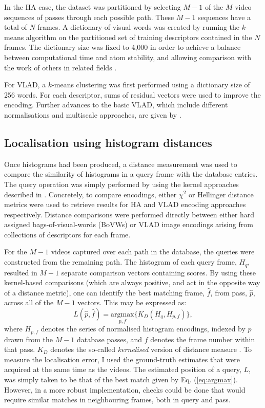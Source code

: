 In the HA case, the dataset was partitioned by selecting $M-1$ of the $M$ video sequences of passes through each possible path. These $M-1$ sequences have a total of $N$ frames. A dictionary of visual words was created by running the $k$-means algorithm on the partitioned set of training descriptors contained in the $N$ frames. The dictionary size was fixed to 4,000 in order to achieve a balance between computational time and atom stability, and allowing comparison with the work of others in related fields \cite{Chatfield2011}.

For VLAD, a $k$-means clustering was first performed using a dictionary size of 256 words. For each descriptor, sums of residual vectors were used to improve the encoding.  Further advances to the basic VLAD, which include different normalisations and multiscale approaches, are given by \cite{Arandjelovic}. 

\subsection{Localisation using histogram distances}
\label{sec:kernel_encodings}
Once histograms had been produced, a distance measurement was used to compare the similarity of histograms in a query frame with the database entries.  The query operation was simply performed by using the kernel approaches described in \cite{Vedaldi2010}.  Concretely, to compare encodings, either $\chi^2$ or Hellinger distance metrics \citep{Vedaldi2012} were used to retrieve results for HA and VLAD encoding approaches respectively. Distance comparisons were performed directly between either hard assigned bags-of-visual-words (BoVWs) or VLAD image encodings arising from collections of descriptors for each frame. 

For the $M-1$ videos captured over each path in the database, the queries were constructed from the remaining path. The histogram of each query frame, $H_q$, resulted in $M-1$ separate comparison vectors containing scores.  By using these kernel-based comparisons (which are always positive, and act in the opposite way of a distance metric), one can identify the best matching frame, $\hat{f}$, from pass, $\hat{p}$, across all of the $M-1$ vectors.  This may be expressed as: 
\begin{equation}
L(\hat{p},\hat{f}) = \underset{p,f}{\textrm{argmax}} \lbrace K_{D}(H_q,H_{p,f})\rbrace,
\label{eq:argmax}
\end{equation}
where $H_{p,f}$ denotes the series of normalised histogram encodings, indexed by $p$ drawn from the $M-1$ database passes, and $f$ denotes the frame number within that pass. $K_D$ denotes the so-called \textit{kernelised} version of distance measure \cite{Vedaldi2010}.  To measure the localisation error, I used the ground-truth estimates that were acquired at the same time as the videos. The estimated position of a query, $L$, was simply taken to be that of the best match given by Eq. (\ref{eq:argmax}).  However, in a more robust implementation, checks could be done that would require similar matches in neighbouring frames, both in query and pass.


